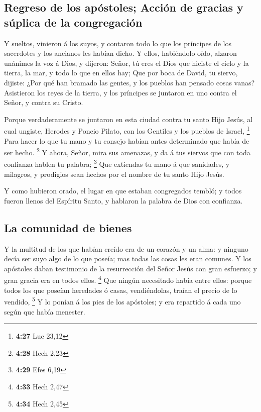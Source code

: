 \hypertarget{regreso-de-los-apuxf3stoles-acciuxf3n-de-gracias-y-suxfaplica-de-la-congregaciuxf3n}{%
\subsection{Regreso de los apóstoles; Acción de gracias y súplica de la
congregación}\label{regreso-de-los-apuxf3stoles-acciuxf3n-de-gracias-y-suxfaplica-de-la-congregaciuxf3n}}

 Y sueltos, vinieron á los suyos, y contaron todo lo que
los príncipes de los sacerdotes y los ancianos les habían dicho.
 Y ellos, habiéndolo oído, alzaron unánimes la voz á
Dios, y dijeron: Señor, tú eres el Dios que hiciste el cielo y la
tierra, la mar, y todo lo que en ellos hay;  Que por boca
de David, tu siervo, dijiste: ¿Por qué han bramado las gentes, y los
pueblos han pensado cosas vanas?  Asistieron los reyes de
la tierra, y los príncipes se juntaron en uno contra el Señor, y contra
su Cristo.

 Porque verdaderamente se juntaron en esta ciudad contra
tu santo Hijo Jesús, al cual ungiste, Herodes y Poncio Pilato, con los
Gentiles y los pueblos de Israel, \footnote{\textbf{4:27} Luc 23,12}
 Para hacer lo que tu mano y tu consejo habían antes
determinado que había de ser hecho. \footnote{\textbf{4:28} Hech 2,23}
 Y ahora, Señor, mira sus amenazas, y da á tus siervos
que con toda confianza hablen tu palabra; \footnote{\textbf{4:29} Efes
  6,19}  Que extiendas tu mano á que sanidades, y
milagros, y prodigios sean hechos por el nombre de tu santo Hijo Jesús.

 Y como hubieron orado, el lugar en que estaban
congregados tembló; y todos fueron llenos del Espíritu Santo, y hablaron
la palabra de Dios con confianza.

\hypertarget{la-comunidad-de-bienes}{%
\subsection{La comunidad de bienes}\label{la-comunidad-de-bienes}}

 Y la multitud de los que habían creído era de un corazón
y un alma: y ninguno decía ser suyo algo de lo que poseía; mas todas las
cosas les eran comunes.  Y los apóstoles daban testimonio
de la resurrección del Señor Jesús con gran esfuerzo; y gran gracia era
en todos ellos. \footnote{\textbf{4:33} Hech 2,47}  Que
ningún necesitado había entre ellos: porque todos los que poseían
heredades ó casas, vendiéndolas, traían el precio de lo vendido,
\footnote{\textbf{4:34} Hech 2,45}  Y lo ponían á los
pies de los apóstoles; y era repartido á cada uno según que había
menester.

